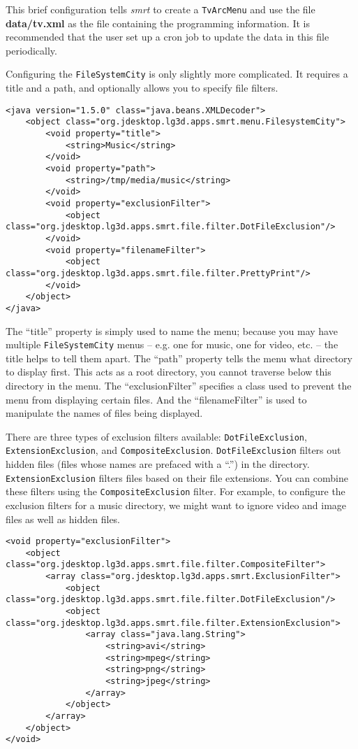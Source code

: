 \documentclass[letterpaper, titlepage, 11pt]{article}
\begin{document}
This brief configuration tells \textit{smrt} to create a \texttt{TvArcMenu} and
use the file \textbf{data/tv.xml} as the file containing the programming
information.  It is recommended that the user set up a cron job to update the
data in this file periodically.

Configuring the \texttt{FileSystemCity} is only slightly more complicated.  It
requires a title and a path, and optionally allows you to specify file filters.

\begin{verbatim}
<java version="1.5.0" class="java.beans.XMLDecoder">
    <object class="org.jdesktop.lg3d.apps.smrt.menu.FilesystemCity">
        <void property="title">
            <string>Music</string>
        </void>
        <void property="path">
            <string>/tmp/media/music</string>
        </void>
        <void property="exclusionFilter">
            <object class="org.jdesktop.lg3d.apps.smrt.file.filter.DotFileExclusion"/>
        </void>
        <void property="filenameFilter">
            <object class="org.jdesktop.lg3d.apps.smrt.file.filter.PrettyPrint"/>
        </void>
    </object>
</java>
\end{verbatim}

The ``title'' property is simply used to name the menu; because you may have
multiple \texttt{FileSystemCity} menus -- e.g. one for music, one for video,
etc. -- the title helps to tell them apart.  The ``path'' property tells the
menu what directory to display first. This acts as a root directory, you cannot
traverse below this directory in the menu.  The ``exclusionFilter'' specifies a
class used to prevent the menu from displaying certain files.  And the
``filenameFilter'' is used to manipulate the names of files being displayed.

There are three types of exclusion filters available:
\texttt{DotFileExclusion}, \texttt{ExtensionExclusion}, and
\texttt{CompositeExclusion}.  \texttt{DotFileExclusion} filters out hidden
files (files whose names are prefaced with a ``.'') in the directory.
\texttt{ExtensionExclusion} filters files based on their file extensions.  You
can combine these filters using the \texttt{CompositeExclusion} filter.  For
example, to configure the exclusion filters for a music directory, we might
want to ignore video and image files as well as hidden files.

\begin{verbatim}
<void property="exclusionFilter">
    <object class="org.jdesktop.lg3d.apps.smrt.file.filter.CompositeFilter">
        <array class="org.jdesktop.lg3d.apps.smrt.ExclusionFilter">
            <object class="org.jdesktop.lg3d.apps.smrt.file.filter.DotFileExclusion"/>
            <object class="org.jdesktop.lg3d.apps.smrt.file.filter.ExtensionExclusion">
                <array class="java.lang.String">
                    <string>avi</string>
                    <string>mpeg</string>
                    <string>png</string>
                    <string>jpeg</string>
                </array>
            </object>
        </array>
    </object>
</void>
\end{verbatim}
\end{document}
